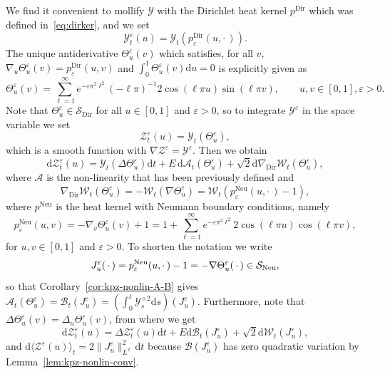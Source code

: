 \documentclass[10pt]{amsart}
\theoremstyle{definition}\newtheorem{defi}[theo]{Definition}\newtheorem{rema}[theo]{Remark}\newtheorem{exam}[theo]{Example}\newtheorem{exem}[theo]{Example}\newtheorem{nota}[theo]{Notation}
\DeclareMathOperator{\Dir}{Dir}
\DeclareMathOperator{\Neu}{Neu}
\newcommand{\mc}[1]{{\mathcal #1}}
\renewcommand{\mc}[1]{{\mathcal #1}}
\newcommand{\Ctwo}{\ensuremath{\mc S_{\Dir}}}
\newcommand*{\dd}{\mathrm{d}}
\newcommand*{\ds}{\dd s}
\newcommand*{\dt}{\dd t}
\newcommand*{\du}{\dd u}
\begin{document}
We find it convenient to mollify $\mc Y$ with the Dirichlet heat kernel $p^{\Dir}$ which was defined in~\eqref{eq:dirker}, and we set
\[
\mc Y^{\varepsilon}_t (u) = \mc Y_t (p^{\Dir}_{\varepsilon} (u,
\cdot\,)).
\]
The unique antiderivative $\Theta^\varepsilon_u(v)$ which satisfies, for all $v$, $\nabla_u \Theta^\varepsilon_u(v) = p^{\Dir}_{\varepsilon} (u,v)$ and $\int_0^1 \Theta^\varepsilon_u(v)\du = 0$ is explicitly given as
\[
\Theta^{\varepsilon}_u (v)= \sum_{\ell = 1}^{\infty} e^{-
\varepsilon \pi^2 \ell^2} (- \ell \pi)^{- 1} 2 \cos (\ell \pi u) \sin (\ell
\pi v), \qquad u,v \in [0,1], \varepsilon > 0.
\]
Note that $\Theta^\varepsilon_u \in \Ctwo$ for all $u \in [0,1]$ and $\varepsilon > 0$, so to integrate $\mc Y^\varepsilon$ in the space variable we set
\[
\mc Z^{\varepsilon}_t (u) = \mc Y_t (\Theta^{\varepsilon}_u),
\]
which is a smooth function with $\nabla \mc Z^{\varepsilon} = \mc Y^{\varepsilon}$. Then we obtain
\[
\dd\mc Z^{\varepsilon}_t (u) = \mc Y_t (\Delta \Theta^{\varepsilon}_u) \dt + E\,\dd \mathcal{A}_t (\Theta^{\varepsilon}_u) + \sqrt2 \dd \mc \nabla_{\Dir} \mc W_t (\Theta^{\varepsilon}_u),
\]
where $\mc A$ is the non-linearity that has been previously defined and
\[
\nabla_{\Dir} \mc W_t (\Theta^{\varepsilon}_u) = - \mc W_t (\nabla \Theta^\varepsilon_u) = \mc W_t (p^{\Neu}_{\varepsilon} (u, \cdot\,) - 1),
\]
where $p^{\Neu}$ is the heat kernel with Neumann boundary conditions, namely
\begin{equation}\label{eq:neuker}
p^{\Neu}_{\varepsilon} (u, v) = - \nabla_v \Theta^{\varepsilon}_u (v) + 1
= 1 + \sum_{\ell = 1}^{\infty} e^{- \varepsilon \pi^2 \ell^2} 2 \cos (\ell \pi u) \cos (\ell \pi v),
\end{equation}
for $u,v\in[0,1]$ and $\varepsilon > 0$. To shorten the notation we write
\[
J^{\varepsilon}_u ({\,\cdot\,}) = p^{\Neu}_{\varepsilon} (u, \cdot\,) - 1 = - \nabla
\Theta^{\varepsilon}_u ({\,\cdot\,}) \in \mc S_{\rm{Neu}},
\]
so that Corollary~\ref{cor:kpz-nonlin-A-B} gives $\mathcal{A}_t (\Theta^{\varepsilon}_u) = \mathcal{B}_t(J^{\varepsilon}_u) = (\int_0^t
\mc Y_s^{\diamond 2} \ds)(J^\varepsilon_u)$. Furthermore, note that $\Delta \Theta^{\varepsilon}_u (v) = \Delta_u \Theta_u^{\varepsilon} (v)$, from where we get
\[
\dd\mc Z^{\varepsilon}_t (u) = \Delta \mc Z^{\varepsilon}_t (u) \dt + E \dd \mathcal{B}_t (J^{\varepsilon}_u) + \sqrt{2} \dd\mc W_t (J^{\varepsilon}_u),
\]
and $\dd \langle \mc Z^{\varepsilon} (u) \rangle_t = 2 \| J^{\varepsilon}_u \|_{L^2}^2 \,\dt$ because $\mc B(J^\varepsilon_u)$ has zero quadratic variation by Lem\-ma~\ref{lem:kpz-nonlin-conv}.
\end{document}
